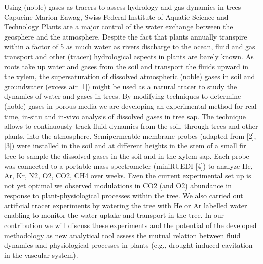 \begin{conf-abstract}
{Using (noble) gases as tracers to assess hydrology and gas dynamics in trees}
{Capucine Marion}
{Eawag, Swiss Federal Institute of Aquatic Science and Technology}
{Plants are a major control of the water exchange between the geosphere and the atmosphere. Despite the fact that plants annually transpire within a factor of 5 as much water as rivers discharge to the ocean, fluid and gas transport and other (tracer) hydrological aspects in plants are barely known. As roots take up water and gases from the soil and transport the fluids upward in the xylem, the supersaturation of dissolved atmospheric (noble) gases in soil and groundwater (excess air [1]) might be used as a natural tracer to study the dynamics of water and gases in trees. By modifying techniques to determine (noble) gases in porous media we are developing an experimental method for real-time, in-situ and in-vivo analysis of dissolved gases in tree sap. The technique allows to continuously track fluid dynamics from the soil, through trees and other plants, into the atmosphere.
Semipermeable membrane probes (adapted from [2], [3]) were installed in the soil and at different heights in the stem of a small fir tree to sample the dissolved gases in the soil and in the xylem sap. Each probe was connected to a portable mass spectrometer (miniRUEDI [4]) to analyze He, Ar, Kr, N2, O2, CO2, CH4 over weeks. Even the current experimental set up is not yet optimal we observed modulations in CO2 (and O2) abundance in response to plant-physiological processes within the tree. We also carried out artificial tracer experiments by watering the tree with He or Ar labelled water enabling to monitor the water uptake and transport in the tree.
In our contribution we will discuss these experiments and the potential of the developed methodology as new analytical tool assess the mutual relation between fluid dynamics and physiological processes in plants (e.g., drought induced cavitation in the vascular system).}
\end{conf-abstract}

